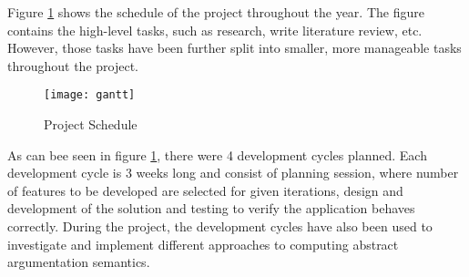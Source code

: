 Figure \ref{fig:projectSchedule} shows the schedule of the project throughout the year. The figure contains the high-level tasks, such as research, write literature review, etc. However, those tasks have been further split into smaller, more manageable tasks throughout the project.  

\begin{landscape}
	\centering
	\begin{figure}[]
		\texttt{[image: gantt]}
		\caption{Project Schedule}
		\label{fig:projectSchedule}
	\end{figure}
\end{landscape}

As can bee seen in figure \ref{fig:projectSchedule}, there were 4 development cycles planned. Each development cycle is 3 weeks long and consist of planning session, where number of features to be developed are selected for given iterations, design and development of the solution and testing to verify the application behaves correctly. During the project, the development cycles have also been used to investigate and implement different approaches to computing abstract argumentation semantics.